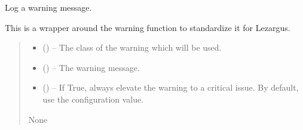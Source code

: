 \documentclass[letterpaper,11pt,english]{sphinxmanual}
\begin{document}
\begin{savenotes}\begin{fulllineitems}
\label{\detokenize{code/lezargus.library.logging:lezargus.library.logging.warning}}
\pysigstartsignatures
{}
\pysigstopsignatures
\sphinxAtStartPar
Log a warning message.

\sphinxAtStartPar
This is a wrapper around the warning function to standardize it for
Lezargus.
\begin{quote}\begin{description}
\begin{itemize}
\item {} 
\sphinxAtStartPar
{} ({\hyperref[\detokenize{code/lezargus.library.logging:lezargus.library.logging.LezargusWarning}]{}}) – The class of the warning which will be used.

\item {} 
\sphinxAtStartPar
{} () – The warning message.

\item {} 
\sphinxAtStartPar
{} (\sphinxstyleliteralemphasis{\sphinxupquote{, }}) – If True, always elevate the warning to a critical issue. By default,
use the configuration value.

\end{itemize}

\sphinxAtStartPar
None

\end{description}\end{quote}

\end{fulllineitems}\end{savenotes}
\end{document}
